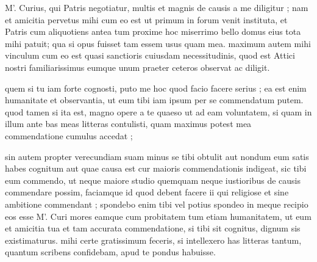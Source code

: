 


 M'. Curius, qui Patris negotiatur, multis et magnis de causis a me diligitur ; nam et amicitia pervetus mihi cum eo est ut primum in forum venit instituta, et Patris cum aliquotiens antea tum proxime hoc miserrimo bello domus eius tota mihi patuit; qua si opus fuisset tam essem usus quam mea. maximum autem mihi vinculum cum eo est quasi sanctioris cuiusdam necessitudinis, quod est Attici nostri familiarissimus eumque unum praeter ceteros observat ac diligit.

 quem si tu iam forte cognosti, puto me hoc quod facio facere serius ; ea est enim humanitate et observantia, ut eum tibi iam ipsum per se commendatum putem. quod tamen si ita est, magno opere a te quaeso ut ad eam voluntatem, si quam in illum ante bas meas litteras contulisti, quam maximus potest mea commendatione cumulus accedat ;

 sin autem propter verecundiam suam minus se tibi obtulit aut nondum eum satis habes cognitum aut quae causa est cur maioris commendationis indigeat, sic tibi eum commendo, ut neque maiore studio quemquam neque iustioribus de causis commendare possim, faciamque id quod debent facere ii qui religiose et sine ambitione commendant ; spondebo enim tibi vel potius spondeo in meque recipio eos esse M'. Curi mores eamque cum probitatem tum etiam humanitatem, ut eum et amicitia tua et tam accurata commendatione, si tibi sit cognitus, dignum sis existimaturus. mihi certe gratissimum feceris, si intellexero has litteras tantum, quantum scribens confidebam, apud te pondus habuisse.
